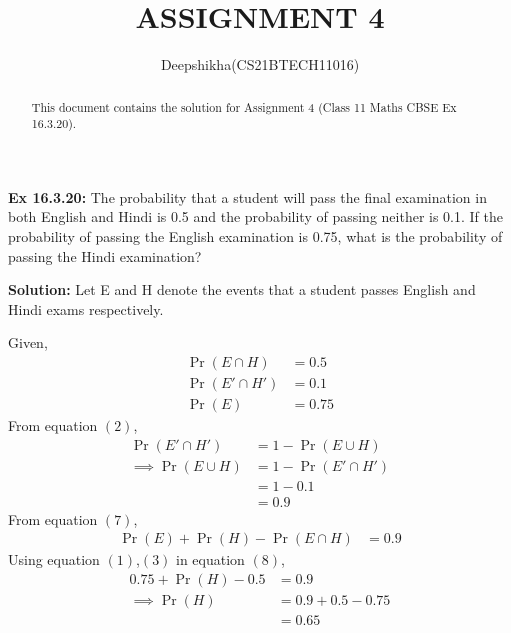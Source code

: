 \documentclass[journal, 12pt, twocolumn]{IEEEtran}
\providecommand{\pr}[1]{\ensuremath{\Pr\left(#1\right)}}
\begin{document}
\title{ASSIGNMENT 4}
\author{Deepshikha(CS21BTECH11016)}
\maketitle


\begin{abstract}
This document contains the solution for Assignment 4 (Class 11 Maths CBSE Ex 16.3.20).
\end{abstract}

\textbf{Ex 16.3.20:}
The probability that a student will pass the final examination in both English and
Hindi is 0.5 and the probability of passing neither is 0.1. If the probability of
passing the English examination is 0.75, what is the probability of passing the
Hindi examination?


\textbf{Solution:}
Let E and H denote the events that a student passes English and Hindi exams respectively.

Given,
\begin{align}
    \pr{E \cap H}            &=0.5\\
    \pr{E' \cap H'} &=0.1\\
    \pr{E}                   &=0.75
\end{align}
From equation $(2)$,
\begin{align}
     \pr{E' \cap H'}&= 1-\pr{E \cup H}\\
     \implies \pr{E \cup H} &=1-\pr{E' \cap H'}\\
                            &=1-0.1\\
                            &=0.9
\end{align}
From equation $(7)$,
\begin{align}
    \pr{E}+\pr{H}-\pr{E \cap H}&=0.9
\end{align}
Using equation $(1)$,$(3)$ in equation $(8)$,
\begin{align}
    0.75+\pr{H}-0.5&=0.9\\
    \implies \pr{H}&=0.9+0.5-0.75\\
                   &=0.65
\end{align}
\end{document}
